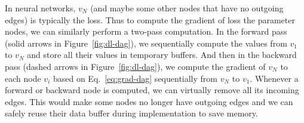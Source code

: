 In neural networks, $v_N$ (and maybe some other nodes that have no outgoing edges) is typically the loss. Thus to compute the gradient of loss \wrt the parameter nodes, we can similarly perform a two-pass computation. In the forward pass (solid arrows in Figure~\ref{fig:dl-dag}), we sequentially compute the values from $v_1$ to $v_N$ and store all their values in temporary buffers. And then in the backward pass (dashed arrows in Figure~\ref{fig:dl-dag}), we compute the gradient of $v_N$ \wrt to each node $v_i$ based on Eq.~\eqref{eq:grad-dag} sequentially from $v_N$ to $v_1$. Whenever a forward or backward node is computed, we can virtually remove all its incoming edges. This would make some nodes no longer have outgoing edges and we can safely reuse their data buffer during implementation to save memory.





